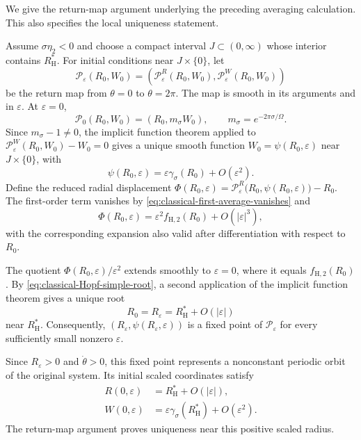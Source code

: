 \documentclass[11pt,reqno]{amsart}
\theoremstyle{plain}
\theoremstyle{definition}
\theoremstyle{remark}
\begin{document}
We give the return-map argument underlying the preceding
averaging calculation. This also specifies the local
uniqueness statement.

Assume $\sigma\eta_2<0$ and choose a compact interval
$J\subset(0,\infty)$ whose interior contains
$R_{\mathrm H}^*$. For initial conditions near
$J\times\{0\}$, let
\[
\mathcal P_\varepsilon(R_0,W_0)
=
\left(
\mathcal P_\varepsilon^R(R_0,W_0),
\mathcal P_\varepsilon^W(R_0,W_0)
\right)
\]
be the return map from $\theta=0$ to $\theta=2\pi$.
The map is smooth in its arguments and in $\varepsilon$.
At $\varepsilon=0$,
\[
\mathcal P_0(R_0,W_0)
=
(R_0,m_\sigma W_0),
\qquad
m_\sigma=e^{-2\pi\sigma/\Omega}.
\]
Since $m_\sigma-1\neq0$, the implicit function theorem
applied to
$
\mathcal P_\varepsilon^W(R_0,W_0)-W_0=0
$
gives a unique smooth function
$
W_0=\psi(R_0,\varepsilon)
$
near $J\times\{0\}$, with
\begin{equation}
\label{eq:classical-Hopf-transverse-elimination}
\psi(R_0,\varepsilon)
=
\varepsilon\gamma_\sigma(R_0)+O(\varepsilon^2).
\end{equation}
Define the reduced radial displacement
$
\Phi(R_0,\varepsilon)
=
\mathcal P_\varepsilon^R
\bigl(R_0,\psi(R_0,\varepsilon)\bigr)-R_0.
$
The first-order term vanishes by
\eqref{eq:classical-first-average-vanishes} and
\[
\Phi(R_0,\varepsilon)
=
\varepsilon^2f_{\mathrm H,2}(R_0)
+O(|\varepsilon|^3),
\]
with the corresponding expansion also valid after
differentiation with respect to $R_0$.

The quotient $\Phi(R_0,\varepsilon)/\varepsilon^2$ extends
smoothly to $\varepsilon=0$, where it equals
$f_{\mathrm H,2}(R_0)$. By
\eqref{eq:classical-Hopf-simple-root}, a second application
of the implicit function theorem gives a unique root
\[
R_0=R_\varepsilon
=
R_{\mathrm H}^*+O(|\varepsilon|)
\]
near $R_{\mathrm H}^*$.
Consequently,
$
\left(R_\varepsilon,\psi(R_\varepsilon,\varepsilon)\right)
$
is a fixed point of $\mathcal P_\varepsilon$ for every
sufficiently small nonzero $\varepsilon$.

Since $R_\varepsilon>0$ and $\dot\theta>0$, this fixed point
represents a nonconstant periodic orbit of the original
system. Its initial scaled coordinates satisfy
\[
\begin{aligned}
R(0,\varepsilon)
&=R_{\mathrm H}^*+O(|\varepsilon|),\\
W(0,\varepsilon)
&=\varepsilon\gamma_\sigma(R_{\mathrm H}^*)
+O(\varepsilon^2).
\end{aligned}
\]
The return-map argument proves uniqueness near this
positive scaled radius.
\end{document}
